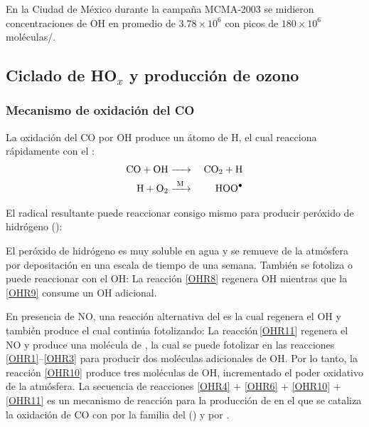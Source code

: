 En la Ciudad de M\'exico durante la campa\~na MCMA-2003 se midieron concentraciones de OH en promedio de  $3.78\times10^6$ con picos de $180\times10^6$ mol\'eculas/\centi\cubic\metre.

\subsection{Ciclado de HO$_x$ y producci\'on de ozono}
\subsubsection{Mecanismo de oxidaci\'on del CO}\label{ciclado}

La oxidaci\'on del CO por OH produce un \'atomo de H, el cual reacciona r\'apidamente con el :
\begin{eqnarray}
\ce{CO + OH & -> &CO2 + H} \label{OHR4}  \\
\ce{H + O2  & ->[M]  & HOO^.}  \label{OHR6} 
\end{eqnarray}

El radical resultante  puede reaccionar consigo mismo para producir per\'oxido de hidr\'ogeno ():


El per\'oxido de hidr\'ogeno es muy soluble en agua y se remueve de la atm\'osfera por depositaci\'on en una escala de tiempo de una semana. Tambi\'en  se  fotoliza o puede  reaccionar con el OH:
La reacci\'on \ref{OHR8} regenera OH mientras que la \ref{OHR9} consume un OH adicional.

En presencia de NO, una reacci\'on alternativa del  es
la cual regenera el OH y tambi\'en produce  el cual contin\'ua fotolizando:
La reacci\'on\,\ref{OHR11} regenera el NO y produce una mol\'ecula de , la cual se puede fotolizar en las reacciones \ref{OHR1}--\ref{OHR3} para producir dos mol\'eculas adicionales de OH. Por lo tanto, la reacci\'on \ref{OHR10} produce tres mol\'eculas de OH, incrementado el poder oxidativo de la atm\'osfera. La secuencia de reacciones \ref{OHR4} + \ref{OHR6} + \ref{OHR10} + \ref{OHR11} es un mecanismo de reacci\'on para la producci\'on de  en el que se cataliza la oxidaci\'on de CO con  por la familia del   ()  y por .

